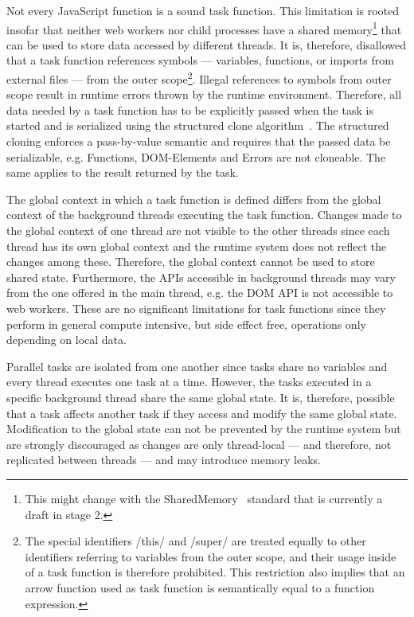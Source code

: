 Not every JavaScript function is a sound task function. This limitation is rooted insofar that neither web workers nor child processes have a shared memory\footnote{This might change with the SharedMemory~\cite{Ecma2016} standard that is currently a draft in stage 2.} that can be used to store data accessed by different threads. It is, therefore, disallowed that a task function references symbols --- variables, functions, or imports from external files --- from the outer scope\footnote{The special identifiers \javascriptinline/this/ and \javascriptinline/super/ are treated equally to other identifiers referring to variables from the outer scope, and their usage inside of a task function is therefore prohibited. This restriction also implies that an arrow function used as task function is semantically equal to a function expression.}. Illegal references to symbols from outer scope result in runtime errors thrown by the runtime environment. Therefore, all data needed by a task function has to be explicitly passed when the task is started and is serialized using the structured clone algorithm~\cite[Section 2.9.4]{WHATWG2016}. The structured cloning enforces a pass-by-value semantic and requires that the passed data be serializable, e.g. Functions, DOM-Elements and Errors are not cloneable. The same applies to the result returned by the task. 

The global context in which a task function is defined differs from the global context of the background threads executing the task function.  Changes made to the global context of one thread are not visible to the other threads since each thread has its own global context and the runtime system does not reflect the changes among these. Therefore, the global context cannot be used to store shared state.  Furthermore, the APIs accessible in background threads may vary from the one offered in the main thread, e.g. the DOM API is not accessible to web workers.  These are no significant limitations for task functions since they perform in general compute intensive, but side effect free, operations only depending on local data.

Parallel tasks are isolated from one another since tasks share no variables and every thread executes one task at a time. However, the tasks executed in a specific background thread share the same global state. It is, therefore, possible that a task affects another task if they access and modify the same global state. Modification to the global state can not be prevented by the runtime system but are strongly discouraged as changes are only thread-local --- and therefore, not replicated between threads --- and may introduce memory leaks. 

